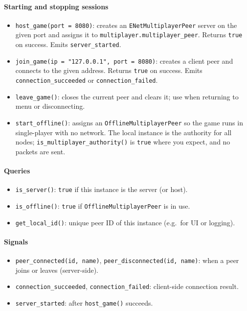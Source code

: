\documentclass{article}
\begin{document}
\paragraph*{Starting and stopping sessions}
\begin{itemize}
  \item \texttt{host\_game(port = 8080)}: creates an
    \texttt{ENetMultiplayerPeer} server on the given port and assigns it
    to \texttt{multiplayer.multiplayer\_peer}. Returns \texttt{true} on
    success. Emits \texttt{server\_started}.
  \item \texttt{join\_game(ip = "127.0.0.1", port = 8080)}: creates a
    client peer and connects to the given address. Returns
    \texttt{true} on success. Emits \texttt{connection\_succeeded} or
    \texttt{connection\_failed}.
  \item \texttt{leave\_game()}: closes the current peer and clears it;
    use when returning to menu or disconnecting.
  \item \texttt{start\_offline()}: assigns an
    \texttt{OfflineMultiplayerPeer} so the game runs in single-player
    with no network. The local instance is the authority for all nodes;
    \texttt{is\_multiplayer\_authority()} is \texttt{true} where you
    expect, and no packets are sent.
\end{itemize}

\paragraph*{Queries}
\begin{itemize}
  \item \texttt{is\_server()}: \texttt{true} if this instance is the
    server (or host).
  \item \texttt{is\_offline()}: \texttt{true} if
    \texttt{OfflineMultiplayerPeer} is in use.
  \item \texttt{get\_local\_id()}: unique peer ID of this instance (e.g.\
    for UI or logging).
\end{itemize}

\paragraph*{Signals}
\begin{itemize}
  \item \texttt{peer\_connected(id, name)}, \texttt{peer\_disconnected(id,
    name)}: when a peer joins or leaves (server-side).
  \item \texttt{connection\_succeeded}, \texttt{connection\_failed}:
    client-side connection result.
  \item \texttt{server\_started}: after \texttt{host\_game()} succeeds.
\end{itemize}
\end{document}
